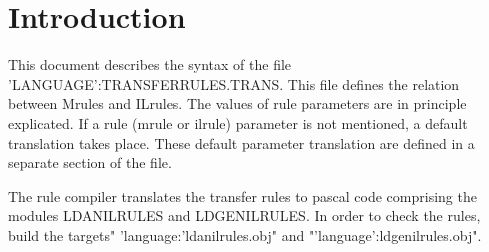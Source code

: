    
      \RosSupersedes{-}
      \MakeRosTitle
\section{Introduction}
This document describes the syntax of the file 'LANGUAGE':TRANSFERRULES.TRANS.
This file defines the relation between Mrules and ILrules. The values of
rule parameters are in principle explicated. If a rule (mrule or ilrule)
parameter is not mentioned, a default translation takes place. These default
parameter translation are defined in a separate section of the file.

The rule compiler translates the transfer rules to pascal code comprising
the modules LDANILRULES and LDGENILRULES. In order to check the rules, build
the targets" 'language:'ldanilrules.obj" and "'language':ldgenilrules.obj".
